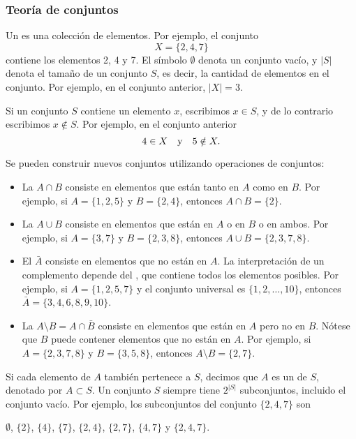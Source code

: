 \subsubsection{Teoría de conjuntos}


Un  es una colección de elementos.
Por ejemplo, el conjunto
\[X=\{2,4,7\}\]
contiene los elementos 2, 4 y 7.
El símbolo $\emptyset$ denota un conjunto vacío,
y $|S|$ denota el tamaño de un conjunto $S$,
es decir, la cantidad de elementos en el conjunto.
Por ejemplo, en el conjunto anterior, $|X|=3$.

Si un conjunto $S$ contiene un elemento $x$,
escribimos $x \in S$,
y de lo contrario escribimos $x \notin S$.
Por ejemplo, en el conjunto anterior
\[4 \in X \hspace{10px}\textrm{y}\hspace{10px} 5 \notin X.\]

\begin{samepage}
Se pueden construir nuevos conjuntos utilizando operaciones de conjuntos:
\begin{itemize}
\item La  $A \cap B$ consiste en elementos
que están tanto en $A$ como en $B$.
Por ejemplo, si $A=\{1,2,5\}$ y $B=\{2,4\}$,
entonces $A \cap B = \{2\}$.
\item La  $A \cup B$ consiste en elementos
que están en $A$ o en $B$ o en ambos.
Por ejemplo, si $A=\{3,7\}$ y $B=\{2,3,8\}$,
entonces $A \cup B = \{2,3,7,8\}$.
\item El  $\bar A$ consiste en elementos
que no están en $A$.
La interpretación de un complemento depende del
, que contiene todos los elementos posibles.
Por ejemplo, si $A=\{1,2,5,7\}$ y el conjunto universal es
$\{1,2,\ldots,10\}$, entonces $\bar A = \{3,4,6,8,9,10\}$.
\item La  $A \setminus B = A \cap \bar B$
consiste en elementos que están en $A$ pero no en $B$.
Nótese que $B$ puede contener elementos que no están en $A$.
Por ejemplo, si $A=\{2,3,7,8\}$ y $B=\{3,5,8\}$,
entonces $A \setminus B = \{2,7\}$.
\end{itemize}
\end{samepage}

Si cada elemento de $A$ también pertenece a $S$,
decimos que $A$ es un  de $S$,
denotado por $A \subset S$.
Un conjunto $S$ siempre tiene $2^{|S|}$ subconjuntos,
incluido el conjunto vacío.
Por ejemplo, los subconjuntos del conjunto $\{2,4,7\}$ son
\begin{center}
$\emptyset$,
$\{2\}$, $\{4\}$, $\{7\}$, $\{2,4\}$, $\{2,7\}$, $\{4,7\}$ y $\{2,4,7\}$.
\end{center}

